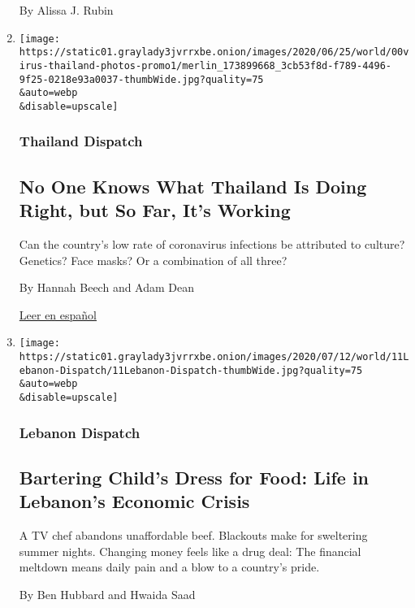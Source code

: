 \begin{enumerate}
  By Alissa J. Rubin
\item
  \href{/2020/07/16/world/asia/coronavirus-thailand-photos.html}{}

  \texttt{[image: https://static01.graylady3jvrrxbe.onion/images/2020/06/25/world/00virus-thailand-photos-promo1/merlin\_173899668\_3cb53f8d-f789-4496-9f25-0218e93a0037-thumbWide.jpg?quality=75\\\&auto=webp\\\&disable=upscale]}

  \hypertarget{thailand-dispatch-1}{%
  \subsubsection{Thailand Dispatch}\label{thailand-dispatch-1}}

  \hypertarget{no-one-knows-what-thailand-is-doing-right-but-so-far-its-working}{%
  \subsection{No One Knows What Thailand Is Doing Right, but So Far,
  It's
  Working}\label{no-one-knows-what-thailand-is-doing-right-but-so-far-its-working}}

  Can the country's low rate of coronavirus infections be attributed to
  culture? Genetics? Face masks? Or a combination of all three?

  By Hannah Beech and Adam Dean

  \href{https://www.nytimes3xbfgragh.onion/es/2020/07/21/espanol/mundo/coronavirus-tailandia.html}{Leer
  en español}
\item
  \href{/2020/07/12/world/middleeast/beirut-lebanon-economic-crisis.html}{}

  \texttt{[image: https://static01.graylady3jvrrxbe.onion/images/2020/07/12/world/11Lebanon-Dispatch/11Lebanon-Dispatch-thumbWide.jpg?quality=75\\\&auto=webp\\\&disable=upscale]}

  \hypertarget{lebanon-dispatch}{%
  \subsubsection{Lebanon Dispatch}\label{lebanon-dispatch}}

  \hypertarget{bartering-childs-dress-for-food-life-in-lebanons-economic-crisis}{%
  \subsection{Bartering Child's Dress for Food: Life in Lebanon's
  Economic
  Crisis}\label{bartering-childs-dress-for-food-life-in-lebanons-economic-crisis}}

  A TV chef abandons unaffordable beef. Blackouts make for sweltering
  summer nights. Changing money feels like a drug deal: The financial
  meltdown means daily pain and a blow to a country's pride.

  By Ben Hubbard and Hwaida Saad
\end{enumerate}

